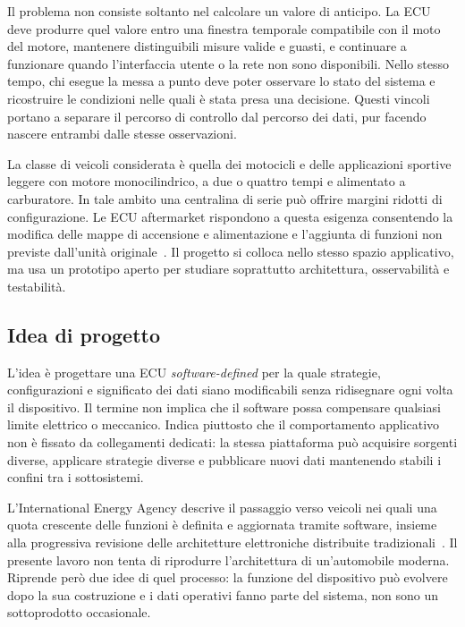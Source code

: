 \documentclass{article}
\begin{document}
Il problema non consiste soltanto nel calcolare un valore di anticipo. La ECU
deve produrre quel valore entro una finestra temporale compatibile con il moto
del motore, mantenere distinguibili misure valide e guasti, e continuare a
funzionare quando l'interfaccia utente o la rete non sono disponibili. Nello
stesso tempo, chi esegue la messa a punto deve poter osservare lo stato del
sistema e ricostruire le condizioni nelle quali è stata presa una decisione.
Questi vincoli portano a separare il percorso di controllo dal percorso dei
dati, pur facendo nascere entrambi dalle stesse osservazioni.

La classe di veicoli considerata è quella dei motocicli e delle applicazioni
sportive leggere con motore monocilindrico, a due o quattro tempi e alimentato a
carburatore. In tale ambito una centralina di serie può offrire margini ridotti
di configurazione. Le ECU aftermarket rispondono a questa esigenza consentendo
la modifica delle mappe di accensione e alimentazione e l'aggiunta di funzioni
non previste dall'unità originale~\cite{linkecu}. Il progetto si colloca nello
stesso spazio applicativo, ma usa un prototipo aperto per studiare soprattutto
architettura, osservabilità e testabilità.

\subsection{Idea di progetto}

L'idea è progettare una ECU \emph{software-defined} per la quale strategie,
configurazioni e significato dei dati siano modificabili senza ridisegnare ogni
volta il dispositivo. Il termine non implica che il software possa compensare
qualsiasi limite elettrico o meccanico. Indica piuttosto che il comportamento
applicativo non è fissato da collegamenti dedicati: la stessa piattaforma può
acquisire sorgenti diverse, applicare strategie diverse e pubblicare nuovi dati
mantenendo stabili i confini tra i sottosistemi.

L'International Energy Agency descrive il passaggio verso veicoli nei quali una
quota crescente delle funzioni è definita e aggiornata tramite software, insieme
alla progressiva revisione delle architetture elettroniche distribuite
tradizionali~\cite{iea_sdv}. Il presente lavoro non tenta di riprodurre
l'architettura di un'automobile moderna. Riprende però due idee di quel processo:
la funzione del dispositivo può evolvere dopo la sua costruzione e i dati
operativi fanno parte del sistema, non sono un sottoprodotto occasionale.
\end{document}

